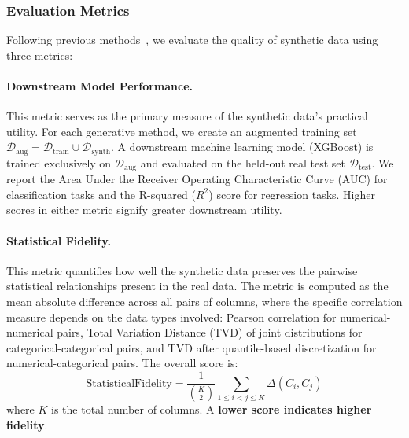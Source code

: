 \subsubsection{Evaluation Metrics}
Following previous methods~\cite{borisov2023language, cllm2024}, we evaluate the quality of synthetic data using three metrics:

\paragraph{Downstream Model Performance.}
This metric serves as the primary measure of the synthetic data's practical utility. For each generative method, we create an augmented training set $\mathcal{D}_{\text{aug}} = \mathcal{D}_{\text{train}} \cup \mathcal{D}_{\text{synth}}$. A downstream machine learning model (XGBoost) is trained exclusively on $\mathcal{D}_{\text{aug}}$ and evaluated on the held-out real test set $\mathcal{D}_{\text{test}}$. We report the Area Under the Receiver Operating Characteristic Curve (AUC) for classification tasks and the R-squared ($R^2$) score for regression tasks. Higher scores in either metric signify greater downstream utility.

\paragraph{Statistical Fidelity.}
This metric quantifies how well the synthetic data preserves the pairwise statistical relationships present in the real data. The metric is computed as the mean absolute difference across all pairs of columns, where the specific correlation measure depends on the data types involved: Pearson correlation for numerical-numerical pairs, Total Variation Distance (TVD) of joint distributions for categorical-categorical pairs, and TVD after quantile-based discretization for numerical-categorical pairs. The overall score is:
\begin{equation}
    \text{StatisticalFidelity} = \frac{1}{\binom{K}{2}} \sum_{1 \le i < j \le K} \Delta(C_i, C_j)
\end{equation}
where $K$ is the total number of columns. A \textbf{lower score indicates higher fidelity}.

